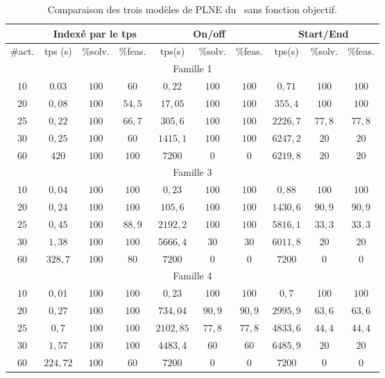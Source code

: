 \begin{table}[ht] \centering
  \begin{tabular}{|c|ccc|ccc|ccc|}
\hline & \multicolumn{3}{c}{Indexé par le tps} & \multicolumn{3}{|c}{On/off} & \multicolumn{3}{|c|}{Start/End}\\ \hline
\#act. & tps (s) & \%solv. &
\%feas. & tps(s) & \%solv. &
\%feas. & tps(s) & \%solv. &
\%feas. \\ \hline 
    \multicolumn{10}{|c|}{Famille 1}\\
    \hline
   $ 10	$&$	0.03	$&$	100	$&$	60	$&$	0,22	$&$	100	$&$	100	$&$	0,71	$&$	100	$&$	100$	\\
   $ 20	$&$	0,08	$&$	100	$&$	54,5	$&$	17,05	$&$	100	$&$	100	$&$	355,4	$&$	100	$&$	100$	\\
    $25	$&$	0,22	$&$	100	$&$	66,7	$&$	305,6	$&$	100	$&$	100	$&$	2226,7	$&$	77,8	$&$	77,8$	\\
    $30	$&$	0,25	$&$	100	$&$	60	$&$	1415,1	$&$	100	$&$	100	$&$	6247,2	$&$	20	$&$	20$	\\
    $60	$&$	420	$&$	100	$&$	100	$&$	7200	$&$	0	$&$	0	$&$	6219,8	$&$	20	$&$	20$	\\
    \hline 
    \multicolumn{10}{|c|}{Famille 3}\\
    \hline
   $ 10	$&$	0,04	$&$	100	$&$	100	$&$	0,23	$&$	100	$&$	100	$&$	0,88	$&$	100	$&$	100$	\\
   $ 20	$&$	0,24	$&$	100	$&$	100	$&$	105,6	$&$	100	$&$	100	$&$	1430,6	$&$	90,9	$&$	90,9$	\\
   $ 25	$&$	0,45	$&$	100	$&$	88,9	$&$	2192,2	$&$	100	$&$	100	$&$	5816,1	$&$	33,3	$&$	33,3$	\\
   $ 30	$&$	1,38	$&$	100	$&$	100	$&$	5666,4	$&$	30	$&$	30	$&$	6011,8	$&$	20	$&$	20$	\\
  $  60	$&$	328,7	$&$	100	$&$	80	$&$	7200	$&$	0	$&$	0	$&$	7200	$&$	0	$&$	0$	\\
    \hline 
    \multicolumn{10}{|c|}{Famille 4}\\
    \hline
   $ 10	$&$	0,01	$&$	100	$&$	100	$&$	0,23	$&$	100	$&$	100	$&$	0,7	$&$	100	$&$	100$	\\
  $  20	$&$	0,27	$&$	100	$&$	100	$&$	734,04	$&$	90,9	$&$	90,9	$&$	2995,9	$&$	63,6	$&$	63,6$	\\
   $ 25	$&$	0,7	$&$	100	$&$	100	$&$	2102,85	$&$	77,8	$&$	77,8	$&$	4833,6	$&$	44,4	$&$	44,4$	\\
   $ 30	$&$	1,57	$&$	100	$&$	100	$&$	4483,4	$&$	60	$&$	60	$&$	6485,9	$&$	20	$&$	20$	\\
   $ 60	$&$	224,72	$&$	100	$&$	60	$&$	7200	$&$	0	$&$	0	$&$	7200	$&$	0	$&$	0$	\\
    \hline
  \end{tabular}
  \caption{Comparaison des trois modèles de PLNE du \CECSP~sans
    fonction objectif.}
  \label{MIPresult}
\end{table} 

